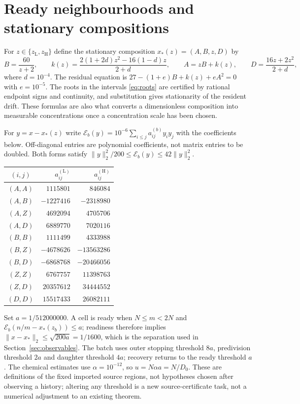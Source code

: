 \documentclass[11pt,a4paper]{article}
\theoremstyle{plain}
\theoremstyle{definition}
\theoremstyle{remark}
\newcommand{\lo}{\mathrm L}
\newcommand{\hi}{\mathrm H}
\begin{document}
\appendix

\section{Ready neighbourhoods and stationary compositions}\label{app:regions}

For $z\in\{z_\lo,z_\hi\}$ define the stationary composition
$x_*(z)=(A,B,z,D)$ by
\begin{equation}\label{eq:stationary}
B=\frac{60}{z+2},\qquad
k(z)=\frac{2(1+2d)z^2-16(1-d)z}{2+d},\qquad
A=zB+k(z),\qquad D=\frac{16z+2z^2}{2+d},
\end{equation}
where $d=10^{-4}$. The residual equation is $27-(1+e)B+k(z)+eA^2=0$ with
$e=10^{-5}$. The roots in the intervals \eqref{eq:roots} are certified by
rational endpoint signs and continuity, and substitution gives stationarity of
the resident drift. These formulas are also what converts a dimensionless
composition into measurable concentrations once a concentration scale has been
chosen.

For $y=x-x_*(z)$ write $\mathcal E_b(y)=10^{-6}\sum_{i\le j}a^{(b)}_{ij}y_iy_j$
with the coefficients below. Off-diagonal entries are polynomial coefficients,
not matrix entries to be doubled. Both forms satisfy
$\|y\|_2^2/200\le\mathcal E_b(y)\le42\|y\|_2^2$.

\begin{center}\small
\begin{tabular}{@{}crr@{}}\toprule
$(i,j)$ & $a^{(\lo)}_{ij}$ & $a^{(\hi)}_{ij}$\\\midrule
$(A,A)$ & $1115801$ & $846084$\\
$(A,B)$ & $-1227416$ & $-2318980$\\
$(A,Z)$ & $4692094$ & $4705706$\\
$(A,D)$ & $6889770$ & $7020116$\\
$(B,B)$ & $1111499$ & $4333988$\\
$(B,Z)$ & $-4678626$ & $-13563286$\\
$(B,D)$ & $-6868768$ & $-20466056$\\
$(Z,Z)$ & $6767757$ & $11398763$\\
$(Z,D)$ & $20357612$ & $34444552$\\
$(D,D)$ & $15517433$ & $26082111$\\\bottomrule
\end{tabular}
\end{center}

Set $a=1/512000000$. A cell is ready when $N\le m<2N$ and
$\mathcal E_b(n/m-x_*(z_b))\le a$; readiness therefore implies
$\|x-x_*\|_2\le\sqrt{200a}=1/1600$, which is the separation used in
Section~\ref{sec:observables}. The batch uses outer stopping threshold $8a$,
predivision threshold $2a$ and daughter threshold $4a$; recovery returns to the
ready threshold $a$. The chemical estimates use $\alpha=10^{-12}$, so
$u=N\alpha a=N/D_0$. These are definitions of the fixed imported source
regions, not hypotheses chosen after observing a history; altering any
threshold is a new source-certificate task, not a numerical adjustment to an
existing theorem.
\end{document}
